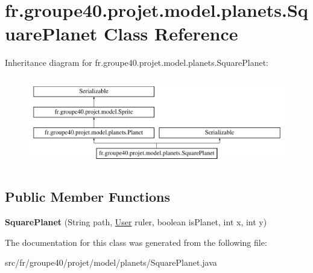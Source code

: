 \hypertarget{classfr_1_1groupe40_1_1projet_1_1model_1_1planets_1_1_square_planet}{}\section{fr.\+groupe40.\+projet.\+model.\+planets.\+Square\+Planet Class Reference}
\label{classfr_1_1groupe40_1_1projet_1_1model_1_1planets_1_1_square_planet}
Inheritance diagram for fr.\+groupe40.\+projet.\+model.\+planets.\+Square\+Planet\+:\begin{figure}[H]
\begin{center}
\leavevmode
\includegraphics[height=3.957597cm]{classfr_1_1groupe40_1_1projet_1_1model_1_1planets_1_1_square_planet}
\end{center}
\end{figure}
\subsection*{Public Member Functions}
\begin{DoxyCompactItemize}
\item 
\mbox{\label{classfr_1_1groupe40_1_1projet_1_1model_1_1planets_1_1_square_planet_af5c59fb2f1bbd57745396640f074f3af}} 
{\bfseries Square\+Planet} (String path, \mbox{\hyperlink{classfr_1_1groupe40_1_1projet_1_1client_1_1_user}{User}} ruler, boolean is\+Planet, int x, int y)
\end{DoxyCompactItemize}


The documentation for this class was generated from the following file\+:\begin{DoxyCompactItemize}
\item 
src/fr/groupe40/projet/model/planets/Square\+Planet.\+java\end{DoxyCompactItemize}
